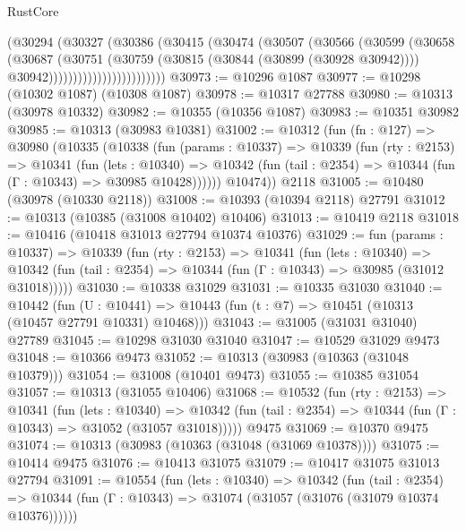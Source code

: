 \begin{lexlean}{RustCore}
\begin{coremodule}
                            (@30294
                              (@30327
                                (@30386
                                  (@30415
                                    (@30474
                                      (@30507
                                        (@30566
                                          (@30599
                                            (@30658
                                              (@30687
                                                (@30751
                                                  (@30759
                                                    (@30815 (@30844 (@30899 (@30928 @30942))))
                                                    @30942))))))))))))))))))))))))
@30973 := @10296 @1087
@30977 := @10298 (@10302 @1087) (@10308 @1087)
@30978 := @10317 @27788
@30980 := @10313 (@30978 @10332)
@30982 := @10355 (@10356 @1087)
@30983 := @10351 @30982
@30985 := @10313 (@30983 @10381)
@31002 := @10312
    (fun (fn : @127) =>
    @30980
      (@10335
        (@10338
          (fun (params : @10337) =>
          @10339
            (fun (rty : @2153) =>
            @10341
              (fun (lets : @10340) =>
              @10342 (fun (tail : @2354) => @10344 (fun (Γ : @10343) => @30985 @10428))))))
        @10474))
    @2118
@31005 := @10480 (@30978 (@10330 @2118))
@31008 := @10393 (@10394 @2118) @27791
@31012 := @10313 (@10385 (@31008 @10402) @10406)
@31013 := @10419 @2118
@31018 := @10416 (@10418 @31013 @27794 @10374 @10376)
@31029 := fun (params : @10337) =>
  @10339
    (fun (rty : @2153) =>
    @10341
      (fun (lets : @10340) =>
      @10342 (fun (tail : @2354) => @10344 (fun (Γ : @10343) => @30985 (@31012 @31018)))))
@31030 := @10338 @31029
@31031 := @10335 @31030
@31040 := @10442
    (fun (U : @10441) => @10443 (fun (t : @7) => @10451 (@10313 (@10457 @27791 @10331) @10468)))
@31043 := @31005 (@31031 @31040) @27789
@31045 := @10298 @31030 @31040
@31047 := @10529 @31029 @9473
@31048 := @10366 @9473
@31052 := @10313 (@30983 (@10363 (@31048 @10379)))
@31054 := @31008 (@10401 @9473)
@31055 := @10385 @31054
@31057 := @10313 (@31055 @10406)
@31068 := @10532
    (fun (rty : @2153) =>
    @10341
      (fun (lets : @10340) =>
      @10342 (fun (tail : @2354) => @10344 (fun (Γ : @10343) => @31052 (@31057 @31018)))))
    @9475
@31069 := @10370 @9475
@31074 := @10313 (@30983 (@10363 (@31048 (@31069 @10378))))
@31075 := @10414 @9475
@31076 := @10413 @31075
@31079 := @10417 @31075 @31013 @27794
@31091 := @10554
    (fun (lets : @10340) =>
    @10342
      (fun (tail : @2354) =>
      @10344 (fun (Γ : @10343) => @31074 (@31057 (@31076 (@31079 @10374 @10376))))))

\end{coremodule}
\end{lexlean}
